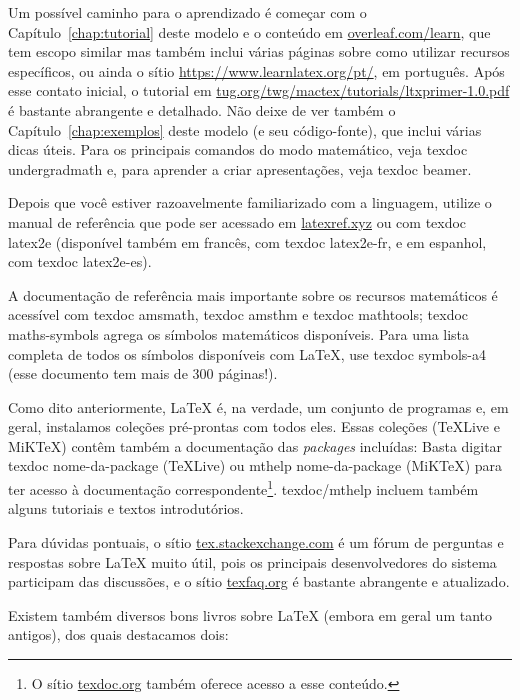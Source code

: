 Um possível caminho para o aprendizado é começar com o
Capítulo~\ref{chap:tutorial} deste modelo e o conteúdo em
\url{overleaf.com/learn}, que tem escopo similar mas também inclui
várias páginas sobre como utilizar recursos específicos, ou ainda
o sítio \url{https://www.learnlatex.org/pt/}, em português. Após esse contato
inicial, o tutorial em \url{tug.org/twg/mactex/tutorials/ltxprimer-1.0.pdf}
é bastante abrangente e detalhado. Não deixe de ver também o
Capítulo~\ref{chap:exemplos} deste modelo (e seu código-fonte), que
inclui várias dicas úteis. Para os principais comandos do modo matemático,
veja \textsf{texdoc undergradmath} e, para aprender a criar apresentações,
veja \textsf{texdoc beamer}.

Depois que você estiver razoavelmente familiarizado com a linguagem,
utilize o manual de referência que pode ser acessado em \url{latexref.xyz}
ou com \textsf{texdoc latex2e} (disponível também em francês, com
\textsf{texdoc latex2e-fr}, e em espanhol, com \textsf{texdoc latex2e-es}).

A documentação de referência mais importante sobre os recursos matemáticos
é acessível com \textsf{texdoc amsmath}, \textsf{texdoc amsthm} e
\textsf{texdoc mathtools}; \textsf{texdoc maths-symbols} agrega os símbolos
matemáticos disponíveis. Para uma lista completa de todos os símbolos
disponíveis com \LaTeX{}, use \textsf{texdoc symbols-a4} (esse documento
tem mais de 300 páginas!).

Como dito anteriormente, \LaTeX{} é, na verdade, um conjunto de programas
e, em geral, instalamos coleções pré-prontas com todos eles. Essas coleções
(\TeX{}Live e MiK\TeX{}) contêm também a documentação das \textit{packages}
incluídas: Basta digitar \textsf{texdoc nome-da-package} (\TeX{}Live) ou
\textsf{mthelp nome-da-package} (MiK\TeX{}) para ter acesso à documentação
correspondente\footnote{O sítio \url{texdoc.org} também oferece acesso a
esse conteúdo.}. \textsf{texdoc/mthelp} incluem também alguns tutoriais e
textos introdutórios.

Para dúvidas pontuais, o sítio \url{tex.stackexchange.com} é um fórum
de perguntas e respostas sobre \LaTeX{} muito útil, pois os principais
desenvolvedores do sistema participam das discussões, e o sítio
\url{texfaq.org} é bastante abrangente e atualizado.

Existem também diversos bons livros sobre \LaTeX{} (embora em geral um
tanto antigos), dos quais destacamos dois:


